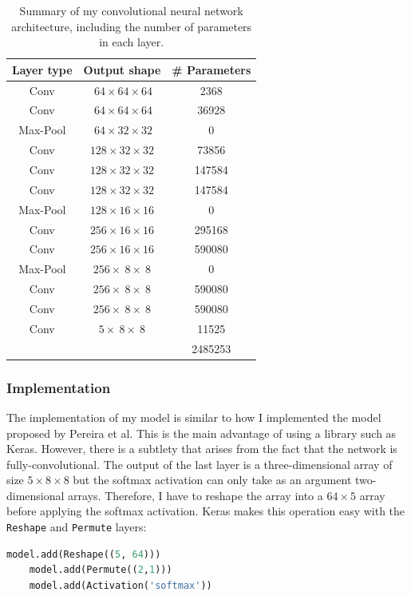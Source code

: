 \documentclass[12pt,a4paper,twoside,openright]{report}
\begin{document}
\begin{table}[h]
\centering	
\begin{tabular}{ c c S[table-format=7.0] } 
\textbf{Layer type} & \textbf{Output shape} & \textbf{\# Parameters} \\
 \hline
 Conv 		& $\ 64 	\times 64 	\times 64$ 	& 2368 \\ 
 Conv 		& $\ 64 	\times 64 	\times 64$ 	& 36928 \\ 
Max-Pool 	& $\ 64 	\times 32 	\times 32$ 	& 0\\
 Conv 		& $128 		\times 32 	\times 32$	& 73856 \\ 
 Conv 		& $128 		\times 32 	\times 32$ 	& 147584 \\ 
 Conv 		& $128 		\times 32 	\times 32$ 	& 147584 \\ 
Max-Pool 	& $128 		\times 16 	\times 16$	& 0\\
 Conv 		& $256 		\times 16 	\times 16$ 	& 295168 \\ 
 Conv 		& $256 		\times 16 	\times 16$ 	& 590080 \\ 
Max-Pool 	& $256 		\times\ 8 	\times\ 8$	& 0\\
 Conv 		& $256 		\times\ 8 	\times\ 8$	& 590080 \\ 
 Conv 		& $256 		\times\ 8 	\times\ 8$ 	& 590080 \\ 
 Conv 		& $5 		\times\ 8 	\times\ 8$ 	& 11525 \\ 
\hhline{~~=}
\rule{0pt}{3ex}    
&& 2485253\\
\end{tabular}
\caption[Summary of my convolutional neural network architecture, including the number of parameters in each layer.]{Summary of my convolutional neural network architecture, including the number of parameters in each layer.}
\label{table:my_model}
\end{table}

\subsubsection{Implementation}
The implementation of my model is similar to how I implemented the model proposed by Pereira et al. This is the main advantage of using a library such as Keras. However, there is a subtlety that arises from the fact that the network is fully-convolutional. The output of the last layer is a three-dimensional array of size $5 \times 8 \times 8$ but the softmax activation can only take as an argument two-dimensional arrays. Therefore, I have to reshape the array into a $64 \times 5$ array before applying the softmax activation. Keras makes this operation easy with the \texttt{Reshape} and \texttt{Permute} layers:
\begin{lstlisting}[language=Python]
	model.add(Reshape((5, 64)))
	model.add(Permute((2,1)))
	model.add(Activation('softmax'))
\end{lstlisting}
\end{document}
